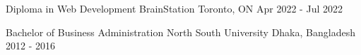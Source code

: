 

\begin{cventries}

  \cventry
    {Diploma in Web Development} %
    {BrainStation} %
    {Toronto, ON} %
    {Apr 2022 - Jul 2022} %
    {
    }
    
  \cventry
    {Bachelor of Business Administration} %
    {North South University} %
    {Dhaka, Bangladesh} %
    {2012 - 2016} %
    {
    }
    
\end{cventries}
